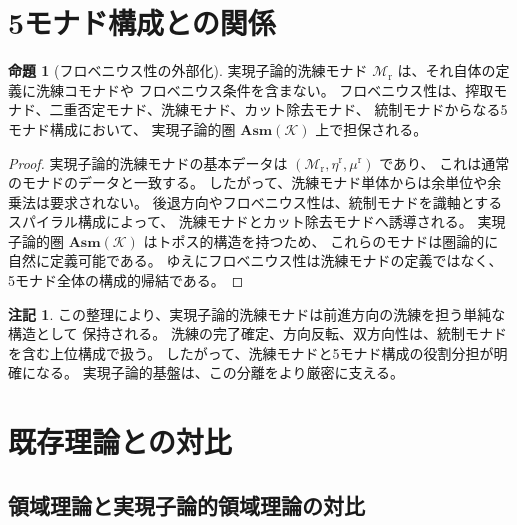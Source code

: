 \documentclass[11pt,a4paper]{article}
\theoremstyle{definition}
\newtheorem{proposition}{命題}[section]
\newtheorem{remark}{注記}[section]
\newcommand{\Mr}{\mathcal{M}_{\mathrm{r}}}
\newcommand{\etar}{\eta^{\mathrm{r}}}
\newcommand{\mur}{\mu^{\mathrm{r}}}
\newcommand{\Asm}{\mathbf{Asm}}
\begin{document}
\section{5モナド構成との関係}

\begin{proposition}[フロベニウス性の外部化]
実現子論的洗練モナド $\Mr$ は、それ自体の定義に洗練コモナドや
フロベニウス条件を含まない。
フロベニウス性は、搾取モナド、二重否定モナド、洗練モナド、カット除去モナド、
統制モナドからなる5モナド構成において、
実現子論的圏 $\Asm(\mathcal{K})$ 上で担保される。
\end{proposition}

\begin{proof}
実現子論的洗練モナドの基本データは $(\Mr,\etar,\mur)$ であり、
これは通常のモナドのデータと一致する。
したがって、洗練モナド単体からは余単位や余乗法は要求されない。
後退方向やフロベニウス性は、統制モナドを識軸とするスパイラル構成によって、
洗練モナドとカット除去モナドへ誘導される。
実現子論的圏 $\Asm(\mathcal{K})$ はトポス的構造を持つため、
これらのモナドは圏論的に自然に定義可能である。
ゆえにフロベニウス性は洗練モナドの定義ではなく、
5モナド全体の構成的帰結である。
\end{proof}

\begin{remark}
この整理により、実現子論的洗練モナドは前進方向の洗練を担う単純な構造として
保持される。
洗練の完了確定、方向反転、双方向性は、統制モナドを含む上位構成で扱う。
したがって、洗練モナドと5モナド構成の役割分担が明確になる。
実現子論的基盤は、この分離をより厳密に支える。
\end{remark}

\section{既存理論との対比}

\subsection{領域理論と実現子論的領域理論の対比}
\end{document}

